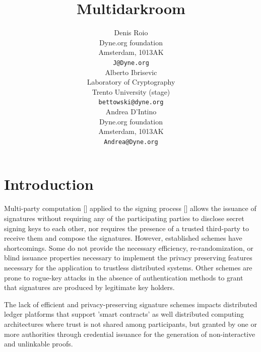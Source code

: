 \documentclass[twocolumn]{article}
\title{Multidarkroom}
\author{
    Denis Roio \\
	Dyne.org foundation \\
	Amsterdam, 1013AK \\
	\texttt{J@Dyne.org} \\
    \And
	Alberto Ibrisevic \\
	Laboratory of Cryptography\\
	Trento University (stage)\\
	\texttt{bettowski@dyne.org} \\
    \And
    Andrea D'Intino \\
    Dyne.org foundation \\
    Amsterdam, 1013AK \\
    \texttt{Andrea@Dyne.org} \\
}
\begin{document}



\section{Introduction}

Multi-party computation [] applied to the signing process [] allows
the issuance of signatures without requiring any of the participating
parties to disclose secret signing keys to each other, nor requires
the presence of a trusted third-party to receive them and compose the
signatures. However, established schemes have shortcomings. Some do
not provide the necessary efficiency, re-randomization, or blind
issuance properties necessary to implement the privacy preserving
features necessary for the application to trustless distributed
systems. Other schemes are prone to rogue-key attacks \citep{ietf-bls}
in the absence of authentication methods to grant that signatures are
produced by legitimate key holders.

The lack of efficient and privacy-preserving signature schemes impacts
distributed ledger platforms that support 'smart contracts' as well
distributed computing architectures where trust is not shared among
participants, but granted by one or more authorities through
credential issuance for the generation of non-interactive and
unlinkable proofs.
\end{document}
